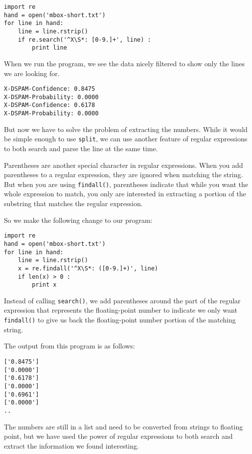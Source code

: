 \beforeverb
\begin{verbatim}
import re
hand = open('mbox-short.txt')
for line in hand:
    line = line.rstrip()
    if re.search('^X\S*: [0-9.]+', line) :
        print line
\end{verbatim}
\afterverb
%
When we run the program, we see the data nicely filtered to show 
only the lines we are looking for.

\beforeverb
\begin{verbatim}
X-DSPAM-Confidence: 0.8475
X-DSPAM-Probability: 0.0000
X-DSPAM-Confidence: 0.6178
X-DSPAM-Probability: 0.0000
\end{verbatim}
\afterverb
%
But now we have to solve the problem of extracting the numbers.  While it would be simple
enough to use {\tt split}, we can use another feature of regular expressions to both search
and parse the line at the same time.

Parentheses are another special character in regular expressions.  When you add parentheses
to a regular expression, they are ignored when matching the string. But when you are using
{\tt findall()}, parentheses indicate that while you want the whole expression to match,
you only are interested in extracting a portion of the substring that matches the regular
expression.  

So we make the following change to our program:

\beforeverb
\begin{verbatim}
import re
hand = open('mbox-short.txt')
for line in hand:
    line = line.rstrip()
    x = re.findall('^X\S*: ([0-9.]+)', line)
    if len(x) > 0 :
        print x
\end{verbatim}
\afterverb
%
Instead of calling {\tt search()}, we add parentheses around the part of the regular expression
that represents the floating-point number to indicate we only want {\tt findall()} to give us
back the floating-point number portion of the matching string.

The output from this program is as follows:

\beforeverb
\begin{verbatim}
['0.8475']
['0.0000']
['0.6178']
['0.0000']
['0.6961']
['0.0000']
..
\end{verbatim}
\afterverb
%
The numbers are still in a list and need to be converted from strings to floating point, but we
have used the power of regular expressions to both search and extract the information we found
interesting.

